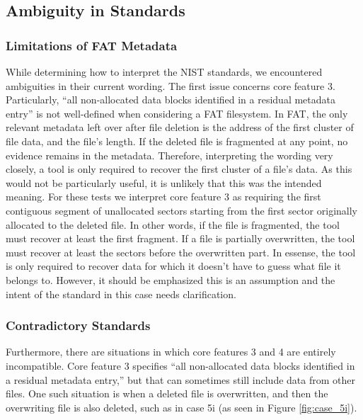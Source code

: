 \subsection{Ambiguity in Standards}

\subsubsection{Limitations of FAT Metadata}
While determining how to interpret the NIST standards, we encountered ambiguities in their current wording.
The first issue concerns core feature 3. 
Particularly, ``all non-allocated data blocks identified in a residual metadata entry''\cite{meta:dfr:standards} is not well-defined when considering a FAT filesystem. 
In FAT, the only relevant metadata left over after file deletion is the address of the first cluster of file data, and the file's length. 
If the deleted file is fragmented at any point, no evidence remains in the metadata. 
Therefore, interpreting the wording very closely, a tool is only required to recover the first cluster of a file's data. 
As this would not be particularly useful, it is unlikely that this was the intended meaning. 
For these tests we interpret core feature 3 as requiring the first contiguous segment of unallocated sectors starting from the first sector originally allocated to the deleted file. 
In other words, if the file is fragmented, the tool must recover at least the first fragment. 
If a file is partially overwritten, the tool must recover at least the sectors before the overwritten part.
In essense, the tool is only required to recover data for which it doesn't have to guess what file it belongs to.
However, it should be emphasized this is an assumption and the intent of the standard in this case needs clarification.

\subsubsection{Contradictory Standards}
Furthermore, there are situations in which core features 3 and 4 are entirely incompatible. 
Core feature 3 specifies ``all non-allocated data blocks identified in a residual metadata entry,''\cite{meta:dfr:standards} but that can sometimes still include data from other files. 
One such situation is when a deleted file is overwritten, and then the overwriting file is also deleted, such as in case 5i (as seen in Figure \ref{fig:case_5i}).

